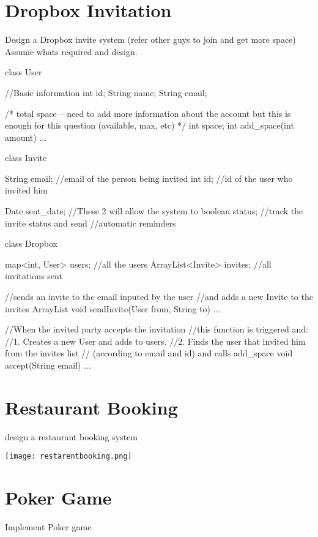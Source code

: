 \section{Dropbox Invitation}
Design a Dropbox invite system (refer other guys to join and get more space) 
Assume whats required and design.

\begin{Code}
	class User {
		//Basic information
		int      id;
		String name;
		String email;
		
		/* total space -- need to add more information about the account 
		but this is enough for this question (available, max, etc)
		*/
		int space;
		int add_space(int amount) {...}
	}
	
	class Invite {
		String email; //email of the person being invited
		int    id;    //id of the user who invited him   
		
		Date   sent_date; //These 2 will allow the system to
		boolean status;   //track the invite status and send
		//automatic reminders
	}
	
	class Dropbox {
		map<int, User> users;   //all the users
		ArrayList<Invite> invites; //all invitations sent
		
		//sends an invite to the email inputed by the user
		//and adds a new Invite to the invites ArrayList
		void sendInvite(User from, String to) {...}
		
		//When the invited party accepts the invitation
		//this function is triggered and: 
		//1. Creates a new User and adds to users.
		//2. Finds the user that invited him from the invites list
		//   (according to email and id) and calls add_space
		void accept(String email) {...}          
	}
\end{Code}

\section{Restaurant Booking}
design a restaurant booking system

\begin{center}
	\texttt{[image: restarentbooking.png]}\\
	\label{fig:rbooking}
\end{center}

\section{Poker Game}
Implement Poker game

